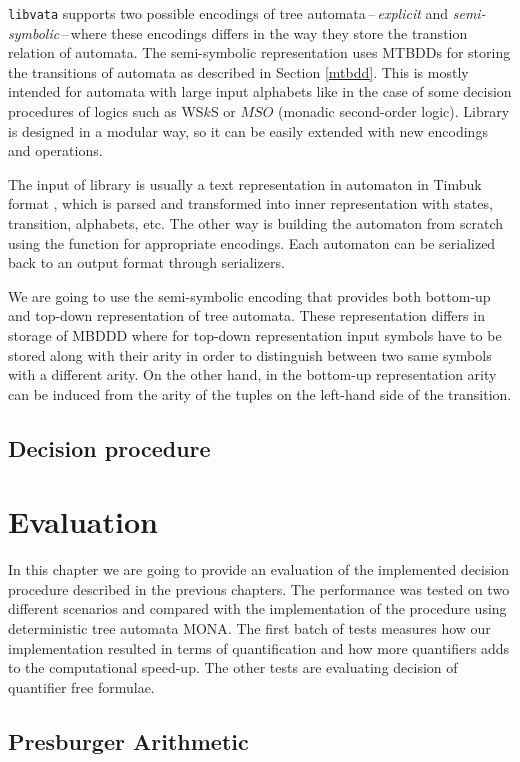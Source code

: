 \texttt{libvata} supports two possible encodings of tree
automata\,--\,\emph{explicit} and \emph{semi-symbolic}\,--\,where these
encodings differs in the way they store the transtion relation of automata. The
semi-symbolic representation uses MTBDDs for storing the transitions of automata
as described in Section \ref{mtbdd}. This is mostly intended for automata with
large input alphabets like in the case of some decision procedures of logics
such as WS$k$S or $MSO$ (monadic second-order logic). Library is designed in a
modular way, so it can be easily extended with new encodings and operations.

The input of library is usually a text representation in automaton in Timbuk
format \cite{timbuk}, which is parsed and transformed into inner representation
with states, transition, alphabets, etc. The other way is building the automaton
from scratch using the function for appropriate encodings. Each automaton can be
serialized back to an output format through serializers.

We are going to use the semi-symbolic encoding that provides both bottom-up and
top-down representation of tree automata. These representation differs in
storage of MBDDD where for top-down representation input symbols have to be
stored along with their arity in order to distinguish between two same symbols
with a different arity. On the other hand, in the bottom-up representation arity
can be induced from the arity of the tuples on the left-hand side of the
transition. 

 \section{Decision procedure}

\chapter{Evaluation}

In this chapter we are going to provide an evaluation of the implemented
decision procedure described in the previous chapters. The performance was
tested on two different scenarios and compared with the implementation of the
procedure using deterministic tree automata \textsc{MONA}. The first batch of
tests measures how our implementation resulted in terms of quantification and
how more quantifiers adds to the computational speed-up. The other tests are
evaluating decision of quantifier free formulae. 

\section{Presburger Arithmetic}

